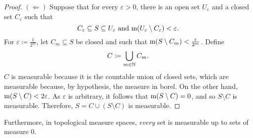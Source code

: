 \begin{prp}
\begin{proof}
\blankline
\noindent
$(\Leftarrow )$ Suppose that for every $\varepsilon >0$, there is an open set $U_{\varepsilon}$ and a closed set $C_{\varepsilon}$ such that
\begin{equation}
C_{\varepsilon}\subseteq S\subseteq U_{\varepsilon}\text{ and }\mathrm{m} (U_{\varepsilon}\setminus C_{\varepsilon})<\varepsilon .
\end{equation}
For $\varepsilon \coloneqq \frac{1}{2^m}$, let $C_m\subseteq S$ be closed and such that $\mathrm{m} (S\setminus C_m)<\frac{\varepsilon}{2^m}$.  Define
\begin{equation}
C\coloneqq \bigcup _{m\in \mathbb{N}}C_m.
\end{equation}
$C$ is measurable because it is the countable union of closed sets, which are measurable because, by hypothesis, the measure in borel.  On the other hand, $\mathrm{m} (S\setminus C)<2\varepsilon$.  As $\varepsilon$ is arbitrary, it follows that $\mathrm{m} (S\setminus C)=0$, and so $S\setminus C$ is measurable.  Therefore, $S=C\cup (S\setminus C)$ is measurable.
\end{proof}
\end{prp}
Furthermore, in topological measure spaces, \emph{every} set is measurable up to sets of measure $0$.

